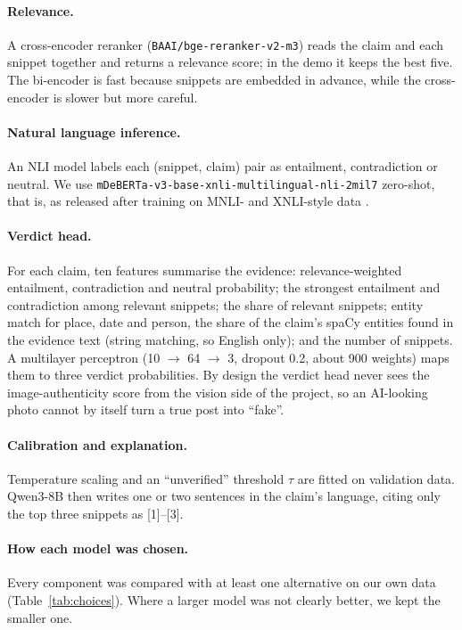\paragraph{Relevance.} A cross-encoder reranker (\texttt{BAAI/bge-reranker-v2-m3}) reads the claim and each snippet together and returns a relevance score; in the demo it keeps the best five. The bi-encoder is fast because snippets are embedded in advance, while the cross-encoder is slower but more careful.

\paragraph{Natural language inference.} An NLI model labels each (snippet, claim) pair as entailment, contradiction or neutral. We use \texttt{mDeBERTa-v3-base-xnli-multilingual-nli-2mil7} \citep{laurer2022mdeberta,he2023debertav3} zero-shot, that is, as released after training on MNLI- and XNLI-style data \citep{conneau2018xnli}.

\paragraph{Verdict head.} For each claim, ten features summarise the evidence: relevance-weighted entailment, contradiction and neutral probability; the strongest entailment and contradiction among relevant snippets; the share of relevant snippets; entity match for place, date and person, the share of the claim's spaCy entities \citep{honnibal2020spacy} found in the evidence text (string matching, so English only); and the number of snippets. A multilayer perceptron (10 $\rightarrow$ 64 $\rightarrow$ 3, dropout 0.2, about 900 weights) maps them to three verdict probabilities. By design the verdict head never sees the image-authenticity score from the vision side of the project, so an AI-looking photo cannot by itself turn a true post into ``fake''.

\paragraph{Calibration and explanation.} Temperature scaling \citep{guo2017calibration} and an ``unverified'' threshold $\tau$ are fitted on validation data. Qwen3-8B then writes one or two sentences in the claim's language, citing only the top three snippets as [1]--[3].

\paragraph{How each model was chosen.} Every component was compared with at least one alternative on our own data (Table~\ref{tab:choices}). Where a larger model was not clearly better, we kept the smaller one.

